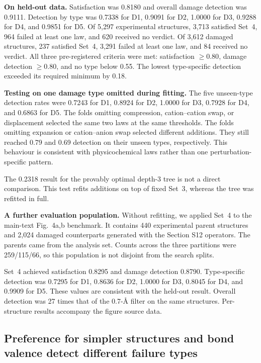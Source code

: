 \textbf{On held-out data.} Satisfaction was 0.8180 and overall damage detection
was 0.9111. Detection by type was 0.7338 for D1, 0.9091 for D2, 1.0000 for D3,
0.9288 for D4, and 0.9851 for D5. Of 5{,}297 experimental structures, 3{,}713
satisfied Set~4, 964 failed at least one law, and 620 received no verdict. Of
3{,}612 damaged structures, 237 satisfied Set~4, 3{,}291 failed at least one law,
and 84 received no verdict. All three pre-registered criteria were met:
satisfaction $\geq0.80$, damage detection $\geq0.80$, and no type below 0.55.
The lowest type-specific detection exceeded its required minimum by 0.18.

\textbf{Testing on one damage type omitted during fitting.} The five unseen-type
detection rates were 0.7243 for D1, 0.8924 for D2, 1.0000 for D3, 0.7928 for D4,
and 0.6863 for D5. The folds omitting compression, cation--cation swap, or
displacement selected the same two laws at the same thresholds. The folds
omitting expansion or cation--anion swap selected different additions. They
still reached 0.79 and 0.69 detection on their unseen types, respectively. This
behaviour is consistent with physicochemical laws rather than one
perturbation-specific pattern.

The 0.2318 result for the provably optimal depth-3 tree is not a direct
comparison. This test refits additions on top of fixed Set~3, whereas the tree
was refitted in full.

\textbf{A further evaluation population.} Without refitting, we applied Set~4 to
the main-text Fig.~4a,b benchmark. It contains 440 experimental parent structures
and 2{,}024 damaged counterparts generated with the Section S12 operators. The
parents came from the analysis set. Counts across the three partitions were
259/115/66, so this population is not disjoint from the search splits.

Set~4 achieved satisfaction 0.8295 and damage detection 0.8790. Type-specific
detection was 0.7295 for D1, 0.8636 for D2, 1.0000 for D3, 0.8045 for D4, and
0.9909 for D5. These values are consistent with the held-out result. Overall
detection was 27 times that of the 0.7-\AA{} filter on the same structures.
Per-structure results accompany the figure source data.

\subsection{Preference for simpler structures and bond valence detect different failure types}

